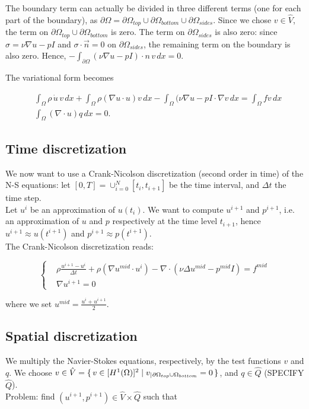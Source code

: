 \documentclass[11pt,a4paper,titlepage]{report}
\begin{document}
The boundary term can actually be divided in three different terms (one for each part of the boundary), as $\partial \Omega = \partial \Omega_{top} \cup \partial \Omega_{bottom} \cup \partial \Omega_{sides}$. Since we chose $v \in \hat{V}$, the term on $\partial \Omega_{top} \cup \partial \Omega_{bottom}$ is zero. The term on $\partial \Omega_{sides}$ is also zero: since $\sigma = \nu \nabla u - pI$ and $\sigma \cdot \vec{n} = 0$ on $\partial \Omega_{sides}$, the remaining term on the boundary is also zero. Hence, $- \int_{\partial \Omega} (\nu \nabla u - pI) \cdot n \, v \, dx = 0$.

The variational form becomes

\begin{align}
&\int_{\Omega} \rho \, \dot{u} \, v \, dx + \int_{\Omega} \rho (\nabla u \cdot u)v \, dx - \int_{\Omega} (\nu \nabla u - pI \cdot \nabla v \, dx = \int_{\Omega} fv \, dx \\
&\int_{\Omega} (\nabla \cdot u) q \, dx = 0.
\end{align}

\subsection{Time discretization}
We now want to use a Crank-Nicolson discretization (second order in time) of the N-S equations: let $[0, T] = \cup^N_{i=0} [t_i, t_{i+1}] $ be the time interval, and $\Delta t$ the time step. \\
Let $u^i$ be an approximation of $u(t_i)$. We want to compute $u^{i+1}$ and $p^{i+1}$, i.e. an approximation of $u$ and $p$ respectively at the time level $t_{i+1}$, hence $u^{i+1} \approx u(t^{i+1})$ and $p^{i+1} \approx p(t^{i+1})$. \\
The Crank-Nicolson discretization reads:

\[
\left\{  
\begin{aligned}
& \rho \frac{u^{i+1} - u^i}{\Delta t} + \rho (\nabla u^{mid} \cdot u^i) - \nabla \cdot (\nu \Delta u^{mid} - p^{mid}I) = f^{mid} \\
& \nabla u^{i+1} = 0
\end{aligned}
\right.
\]

where we set $u^{mid} = \frac{u^i + u^{i+1}}{2}$.

\subsection{Spatial discretization}
We multiply the Navier-Stokes equations, respectively, by the test functions $v$ and $q$. We choose $v \in \hat{V} = \set{v \in [H^1(\Omega)]^2 | v_|{_{\partial \Omega_{top} \cup \Omega_{bottom}}} = 0}$, and $q \in \hat{Q}$ (SPECIFY $\hat{Q}$). \\
Problem: find $(u^{i+1}, p^{i+1}) \in \hat{V} \times \hat{Q}$ such that 
\end{document}
